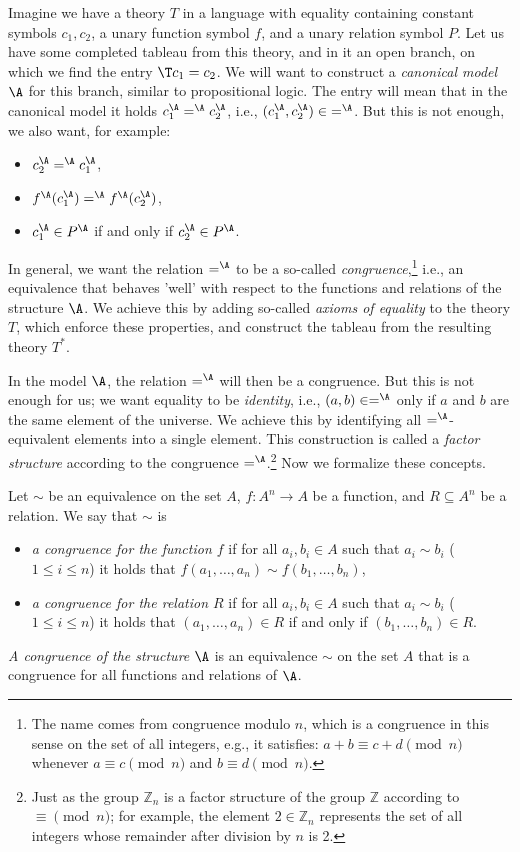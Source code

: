 Imagine we have a theory $T$ in a language with equality containing constant symbols $c_1,c_2$, a unary function symbol $f$, and a unary relation symbol $P$. Let us have some completed tableau from this theory, and in it an open branch, on which we find the entry $\T c_1=c_2$. We will want to construct a \emph{canonical model} $\A$ for this branch, similar to propositional logic. The entry will mean that in the canonical model it holds $c_1^\A =^\A c_2^\A$, i.e., $(c_1^\A,c_2^\A)\in {=^\A}$. But this is not enough, we also want, for example:
\begin{itemize}
    \item $c_2^\A =^\A c_1^\A$,
    \item $f^\A(c_1^\A) =^\A f^\A(c_2^\A)$,
    \item $c_1^\A \in P^\A$ if and only if $c_2^\A \in P^\A$.
\end{itemize}
In general, we want the relation $=^\A$ to be a so-called \emph{congruence},\footnote{The name comes from congruence modulo $n$, which is a congruence in this sense on the set of all integers, e.g., it satisfies: $a+b\equiv c+d\pmod n$ whenever $a\equiv c\pmod n$ and $b\equiv d\pmod n$.} i.e., an equivalence that behaves 'well' with respect to the functions and relations of the structure $\A$. We achieve this by adding so-called \emph{axioms of equality} to the theory $T$, which enforce these properties, and construct the tableau from the resulting theory $T^*$.

In the model $\A$, the relation $=^\A$ will then be a congruence. But this is not enough for us; we want equality to be \emph{identity}, i.e., $(a,b)\in=^\A$ only if $a$ and $b$ are the same element of the universe. We achieve this by identifying all $=^\A$-equivalent elements into a single element. This construction is called a \emph{factor structure} according to the congruence $=^\A$.\footnote{Just as the group $\mathbb Z_n$ is a factor structure of the group $\mathbb Z$ according to $\equiv\pmod n$; for example, the element $2\in\mathbb Z_n$ represents the set of all integers whose remainder after division by $n$ is 2.} Now we formalize these concepts.

\begin{definition}[Congruence]
    Let $\sim$ be an equivalence on the set $A$, $f\colon A^n\to A$ be a function, and $R\subseteq A^n$ be a relation. We say that $\sim$ is
    \begin{itemize}
        \item \emph{a congruence for the function $f$} if for all $a_i,b_i\in A$ such that $a_i\sim b_i$ ($1\leq i\leq n$) it holds that $f(a_1,\dots,a_n)\sim f(b_1,\dots,b_n)$,
        \item \emph{a congruence for the relation $R$} if for all $a_i,b_i\in A$ such that $a_i\sim b_i$ ($1\leq i\leq n$) it holds that $(a_1,\dots,a_n)\in R$ if and only if $(b_1,\dots,b_n)\in R$.
    \end{itemize}    
    \emph{A congruence of the structure} $\A$ is an equivalence $\sim$ on the set $A$ that is a congruence for all functions and relations of $\A$. 
\end{definition}

